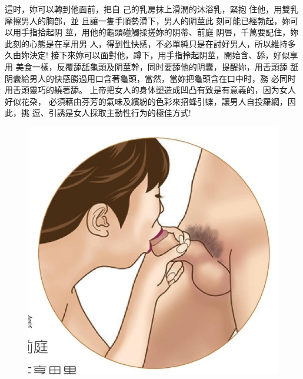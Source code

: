 \documentclass[12pt,UTF8]{ctexbook}
\begin{document}
這时，妳可以轉到他面前，把自
己的乳房抹上滑潤的沐浴乳，緊抱
住他，用雙乳摩擦男人的胸部，並
且讓一隻手順勢滑下，男人的阴莖此
刻可能已經勃起，妳可以用手指拾起阴
莖，用他的龜頭碰觸揉搓妳的阴蒂、前庭
阴唇，千萬要記住，妳此刻的心態是在享用男
人，得到性快感，不必單純只是在討好男人，所以維持多久由妳決定!
接下來妳可以面對他，蹲下，用手指拎起阴莖，開始含、舔，好似享用
美食一樣，反覆舔舐龜頭及阴莖幹，同时要舔他的阴囊，提醒妳，用舌頭舔
舐阴囊給男人的快感勝過用口含著龜頭，當然，當妳把龜頭含在口中时，務
必同时用舌頭靈巧的繞著舔。
上帝把女人的身体塑造成凹凸有致是有意義的，因为女人好似花朶，
必須藉由芬芳的氣味及繽紛的色彩來招蜂引蝶，讓男人自投羅網，因此，挑
逗、引誘是女人採取主動性行为的極佳方式!

\begin{figure}[htbp]
	\centering
	\includegraphics[width=0.7\linewidth]{15}
	\caption{}
	\label{fig:1}
\end{figure}
\end{document}

